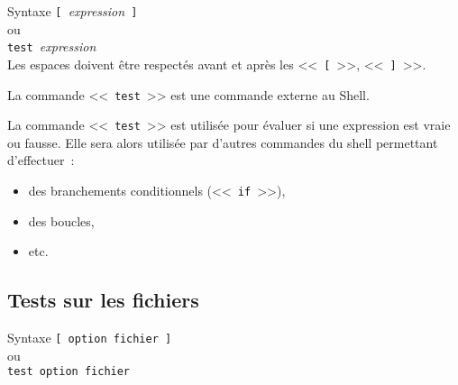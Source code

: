 \begin{definition}{Syntaxe}
\verb*=[ =\textit{expression}\verb*= ]=\\
ou\\
\verb*=test =\textit{expression}\\[1ex]
Les espaces doivent {\^e}tre respect{\'e}s avant et apr{\`e}s les <<~\verb=[=~>>, <<~\verb=]=~>>.
\end{definition}

\begin{remarque}
La commande <<~\texttt{test}~>> est une commande externe au Shell.
\end{remarque}

La commande <<~\texttt{test}~>> est utilis{\'e}e pour {\'e}valuer si une expression est vraie
ou fausse. Elle sera alors utilis{\'e}e par d'autres commandes du shell permettant
d'effectuer~:
\begin{itemize}
	\item	des branchements conditionnels (<<~\texttt{if}~>>),
	\item	des boucles,
	\item	etc.
\end{itemize}

\subsection{Tests sur les fichiers}

\begin{definition}{Syntaxe}
\verb*=[ option fichier ]=\\
ou \\
\verb*=test option fichier=
\end{definition}

